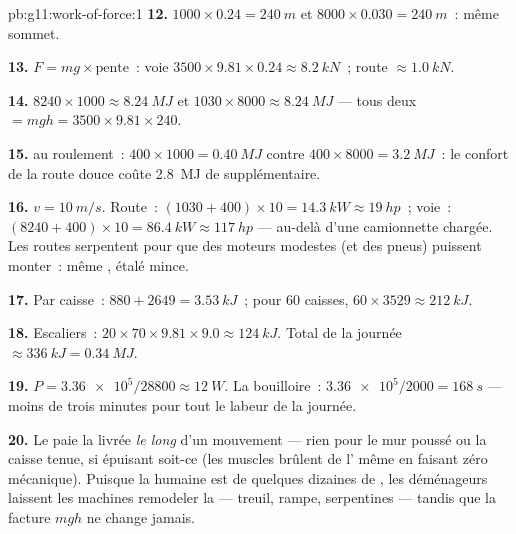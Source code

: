 \begin{solution}{pb:g11:work-of-force:1}
\textbf{12.} $1000 \times 0.24 = \qty{240}{m}$ et
$8000 \times 0.030 = \qty{240}{m}$~: même sommet.

\textbf{13.} $F = mg \times \text{pente}$~: voie
$3500 \times 9.81 \times 0.24 \approx \qty{8.2}{kN}$~; route
$\approx \qty{1.0}{kN}$.

\textbf{14.} $8240 \times 1000 \approx \qty{8.24}{MJ}$ et
$1030 \times 8000 \approx \qty{8.24}{MJ}$ --- tous deux $= mgh = 3500
\times 9.81 \times 240$.

\textbf{15.}  au
roulement~: $400 \times 1000 = \qty{0.40}{MJ}$ contre
$400 \times 8000 = \qty{3.2}{MJ}$~: le confort de la route douce coûte
\qty{2.8}{MJ} de  supplémentaire.

\textbf{16.} $v = \qty{10}{m/s}$. Route~:
$(1030 + 400) \times 10 = \qty{14.3}{kW} \approx \qty{19}{hp}$~; voie~:
$(8240 + 400) \times 10 = \qty{86.4}{kW} \approx \qty{117}{hp}$ ---
au-delà d'une camionnette chargée. Les routes serpentent pour que des
moteurs modestes (et des pneus) puissent monter~: même
, étalé
mince.

\textbf{17.} Par caisse~: $880 + 2649 = \qty{3.53}{kJ}$~; pour $60$
caisses, $60 \times 3529 \approx \qty{212}{kJ}$.

\textbf{18.} Escaliers~: $20 \times 70 \times 9.81 \times 9.0 \approx
\qty{124}{kJ}$. Total de la journée $\approx \qty{336}{kJ} =
\qty{0.34}{MJ}$.

\textbf{19.} $P = \num{3.36e5}/28800 \approx \qty{12}{W}$. La
bouilloire~: $\num{3.36e5}/2000 = \qty{168}{s}$ --- moins de trois
minutes pour tout le labeur de la journée.

\textbf{20.} Le  paie la
 livrée \emph{le long} d'un
mouvement --- rien pour le mur poussé ou la caisse tenue, si épuisant
soit-ce (les muscles brûlent de l'
 même en faisant zéro
 mécanique). Puisque la
 humaine est de quelques dizaines
de , les déménageurs laissent les
machines remodeler la  --- treuil, rampe,
serpentines --- tandis que la facture $mgh$ ne change jamais.
\end{solution}
